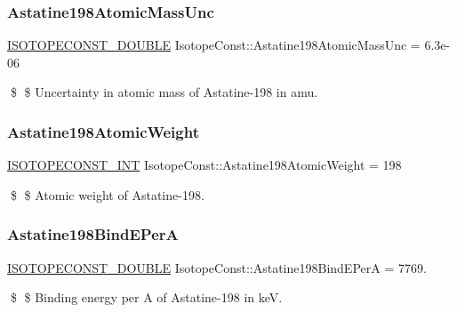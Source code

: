 \subsubsection{\texorpdfstring{Astatine198\+Atomic\+Mass\+Unc}{Astatine198AtomicMassUnc}}
{\footnotesize\ttfamily \mbox{\hyperlink{group___isotope_const-_macros_ga8f45a7272ce02c0b4c65c44636ed719a}{I\+S\+O\+T\+O\+P\+E\+C\+O\+N\+S\+T\+\_\+\+D\+O\+U\+B\+LE}} Isotope\+Const\+::\+Astatine198\+Atomic\+Mass\+Unc = 6.\+3e-\/06}

\$ \$ Uncertainty in atomic mass of Astatine-\/198 in amu. \mbox{\label{group___isotope_const-_astatine-_at198_ga47099d1e1bea67ee2040cd896efe86f5}} 
\subsubsection{\texorpdfstring{Astatine198\+Atomic\+Weight}{Astatine198AtomicWeight}}
{\footnotesize\ttfamily \mbox{\hyperlink{group___isotope_const-_macros_ga5f18360b3e99483a35c32d789e62621c}{I\+S\+O\+T\+O\+P\+E\+C\+O\+N\+S\+T\+\_\+\+I\+NT}} Isotope\+Const\+::\+Astatine198\+Atomic\+Weight = 198}

\$ \$ Atomic weight of Astatine-\/198. \mbox{\label{group___isotope_const-_astatine-_at198_gabd1512467ba90028d2ae4945bb1b7e01}} 
\subsubsection{\texorpdfstring{Astatine198\+Bind\+E\+PerA}{Astatine198BindEPerA}}
{\footnotesize\ttfamily \mbox{\hyperlink{group___isotope_const-_macros_ga8f45a7272ce02c0b4c65c44636ed719a}{I\+S\+O\+T\+O\+P\+E\+C\+O\+N\+S\+T\+\_\+\+D\+O\+U\+B\+LE}} Isotope\+Const\+::\+Astatine198\+Bind\+E\+PerA = 7769.}

\$ \$ Binding energy per A of Astatine-\/198 in keV. \mbox{\label{group___isotope_const-_astatine-_at198_ga282ad23bffc3ca07fe9bf1df2f372f46}} 
